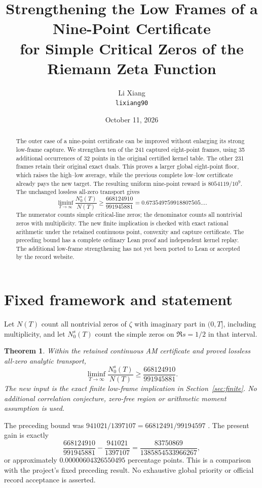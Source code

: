 \documentclass[11pt,a4paper]{article}
\title{Strengthening the Low Frames of a Nine-Point Certificate\\
for Simple Critical Zeros of the Riemann Zeta Function}
\author{Li Xiang\\\small\texttt{lixiang90}}
\date{October 11, 2026}
\newtheorem{theorem}{Theorem}[section]
\begin{document}
\maketitle
\begin{abstract}
The outer case of a nine-point certificate can be improved without
enlarging its strong low-frame capture. We strengthen ten of the 241
captured eight-point frames, using 35 additional occurrences of
32 points in the original certified kernel table. The other 231 frames
retain their original exact duals. This proves a larger global
eight-point floor, which raises the high--low average, while the
previous complete low--low certificate already pays the new target.
The resulting uniform nine-point reward is $8054119/10^9$. The unchanged
lossless all-zero transport gives
\[
 \liminf_{T\to\infty}\frac{N_0^s(T)}{N(T)}
 \ge \frac{668124910}{991945881}=0.673549759918807505\ldots.
\]
The numerator counts simple critical-line zeros; the denominator
counts all nontrivial zeros with multiplicity. The new finite
implication is checked with exact rational arithmetic under the
retained continuous point, convexity and capture certificate.
The preceding bound has a complete ordinary Lean proof and independent
kernel replay. The additional low-frame strengthening has not yet
been ported to Lean or accepted by the record website.
\end{abstract}

\section{Fixed framework and statement}

Let $N(T)$ count all nontrivial zeros of $\zeta$ with imaginary part
in $(0,T]$, including multiplicity, and let $N_0^s(T)$ count the simple
zeros on $\Re s=1/2$ in that interval.

\begin{theorem}\label{thm:main}
Within the retained continuous AM certificate and proved lossless
all-zero analytic transport,
\[
 \liminf_{T\to\infty}\frac{N_0^s(T)}{N(T)}
 \ge \frac{668124910}{991945881}.
\]
The new input is the exact finite low-frame implication in
Section~\ref{sec:finite}. No additional correlation conjecture,
zero-free region or arithmetic moment assumption is used.
\end{theorem}

The preceding bound was $941021/1397107=66812491/99194597$
\cite{Ninth}. The present gain is exactly
\[
 \frac{668124910}{991945881}-\frac{941021}{1397107}
 =\frac{83750869}{1385854533966267},
\]
or approximately $0.00000604326550495$ percentage points. This is a
comparison with the project's fixed preceding result. No exhaustive
global priority or official record acceptance is asserted.
\end{document}
